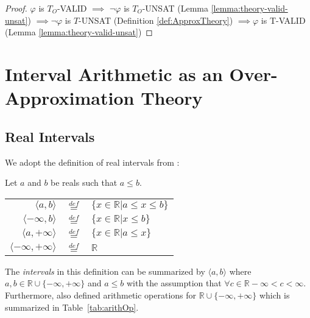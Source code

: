 \begin{proof}
$\varphi$ is $T_O$-VALID $\implies$ $\neg\varphi$ is $T_O$-UNSAT (Lemma \ref{lemma:theory-valid-unsat}) $\implies \neg\varphi$ is $T$-UNSAT (Definition \ref{def:ApproxTheory}) $\implies \varphi$ is T-VALID (Lemma \ref{lemma:theory-valid-unsat})
\end{proof}


\section{Interval Arithmetic as an Over-Approximation Theory}\label{sec:IA}
\subsection{Real Intervals}
We adopt the definition of real intervals from \cite{Hickey:2001:IAP:502102.502106}:
\begin{definition}\cite{Hickey:2001:IAP:502102.502106}
Let $a$ and $b$ be reals such that $a \le b$.
\begin{center}
\begin{tabular}{ r c l }
  $\langle a, b \rangle$ & $\overset{def}{=}$ & $\{x \in \mathbb{R} | a \le x \le b\}$ \\
  $\langle -\infty, b \rangle$ & $\overset{def}{=}$ & $\{x \in \mathbb{R} | x \le b\}$ \\
  $\langle a, +\infty \rangle$ & $\overset{def}{=}$ & $\{x \in \mathbb{R} | a \le x\}$ \\  
  $\langle -\infty, +\infty \rangle$ & $\overset{def}{=}$ & $\mathbb{R}$ \\  
\end{tabular}
\end{center}
\end{definition}
The \emph{intervals} in this definition can be summarized by $\langle a, b \rangle$ where $a, b \in \mathbb{R} \cup \{-\infty, +\infty\}$ and $a \le b$ with the assumption that $\forall c \in \mathbb{R}-\infty < c < \infty$. Furthermore,\citet{Hickey:2001:IAP:502102.502106} also defined arithmetic operations for $\mathbb{R} \cup \{-\infty, +\infty\}$ which is summarized in Table~\ref{tab:arithOp}.

